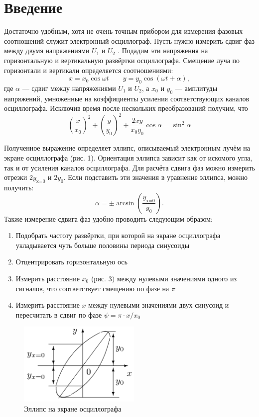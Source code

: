 \documentclass[12pt]{article}
\begin{document}
\section*{Введение}
  Достаточно удобным, хотя не очень точным прибором для измерения фазовых соотношений служит электронный осциллограф. Пусть нужно измерить сдвиг фаз между двумя напряжениями $U_1$ и  $U_2$ . Подадим эти напряжения на горизонтальную и вертикальную развёртки осциллографа. Смещение луча по горизонтали и вертикали определяется соотношениями:
\[
	x = x_0 \cos \omega t \qquad y = y_0 \cos  \left(\omega t + \alpha \right),
\] 
где $\alpha$ --- сдвиг между напряжениями $U_1$ и  $U_2$, а $x_0$ и $y_0$ --- амплитуды напряжений, умноженные на коэффициенты усиления соответствующих каналов осциллографа. Исключив время после нескольких преобразований получим, что
\[
	\left(\frac{x}{x_0}\right)^2 + \left(\frac{y}{y_0}\right)^2 + \frac{2 x y}{x_0 y_0} \cos \alpha = \sin^2 \alpha 
\]
\par   
Полученное выражение определяет эллипс, описываемый электронным лучём на экране осциллографа (рис. 1). Ориентация эллипса зависит как от искомого угла, так и от усиления каналов осциллографа. Для расчёта сдвига фаз можно измерить отрезки $2 y_\text{x=0}$ и $2 y_0$. Если подставить эти значения в уравнение эллипса, можно получить:
\[
  \alpha = \pm \arcsin \left(\frac{y_\text{x=0}}{y_0}\right).
\]
Также измерение сдвига фаз удобно проводить следующим образом:
\begin{enumerate}
	\item 
		Подобрать частоту развёртки, при которой на экране осциллографа укладывается чуть больше половины периода синусоиды
	\item
		Отцентрировать горизонтальную ось
	\item
		Измерить расстояние $x_0 $ (рис. 3) между нулевыми значениями одного из сигналов, что соответствует смещению по фазе на $\pi$
	\item
		Измерить расстояние $x$ между нулевыми значениями двух синусоид и пересчитать в сдвиг по фазе $\psi = \pi \cdot x / x_0 $	
\end{enumerate}
\begin{figure}[h!]
	\centering
	\includegraphics[height=40mm]{image1.png}
	\caption{Эллипс на экране осциллографа}
	\label{image1}
\end{figure}
\end{document}
